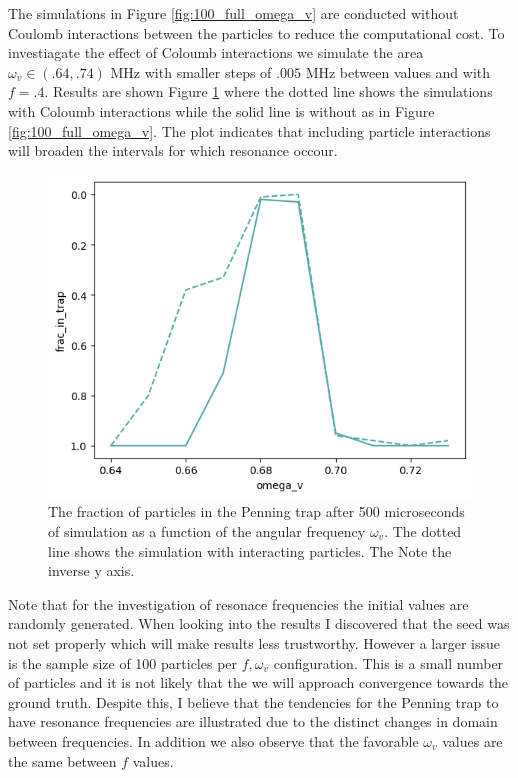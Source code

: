 \documentclass[../main_proj3.tex]{subfiles}
\begin{document}
The simulations in Figure \ref{fig:100_full_omega_v} are conducted without Coulomb interactions between the particles to reduce the computational cost. To investiagate the effect of Coloumb interactions we simulate the area $\omega_v \in(.64, .74)$ MHz with smaller steps of $.005$ MHz between values and with $f=.4$. Results are shown Figure \ref{fig:100_small_omega_v} where the dotted line shows the simulations with Coloumb interactions while the solid line is without as in Figure \ref{fig:100_full_omega_v}. The plot indicates that including particle interactions will broaden the intervals for which resonance occour. 

\begin{figure}[h!]
    \centering
    \includegraphics[width=0.9\linewidth]{Project 3/figures/100_particle_small_fq.png}
    \caption{The fraction of particles in the Penning trap after 500 microseconds of simulation as a function of the angular frequency $\omega_v$. The dotted line shows the simulation with interacting particles. The Note the inverse y axis.}
    \label{fig:100_small_omega_v}
\end{figure}


Note that for the investigation of resonace frequencies the initial values are randomly generated. When looking into the results I discovered that the seed was not set properly which will make results less trustworthy. However a larger issue is the sample size of 100 particles per $f, \omega_v$ configuration. This is a small number of particles and it is not likely that the we will approach convergence towards the ground truth. Despite this, I believe that the tendencies for the Penning trap to have resonance frequencies are illustrated due to the distinct changes in domain between frequencies. In addition we also observe that the favorable $\omega_v$ values are the same 
between $f$ values. 
\end{document}

